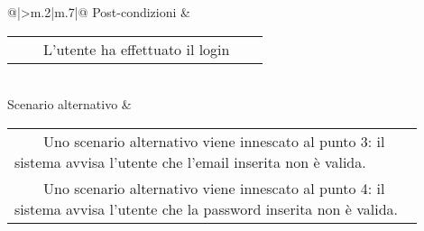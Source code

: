 \begin{table}[H]
\begin{longtable}{@{}|>{\centering\arraybackslash}m{.2\textwidth}|m{.7\textwidth}|@{}}
		Post-condizioni & \begin{tabular}{m{0.9\linewidth}}~~\llap{\textbullet}~~L'utente ha effettuato il login\\\end{tabular}\\
		Scenario alternativo & \begin{tabular}{m{0.9\linewidth}}~~\llap{\textbullet}~~Uno scenario alternativo viene innescato al punto 3: il sistema avvisa l'utente che l'email inserita non è valida.\\~~\llap{\textbullet}~~Uno scenario alternativo viene innescato al punto 4: il sistema avvisa l'utente che la password inserita non è valida.\\\end{tabular}\\\hline
		
	\end{longtable}
\end{table}

